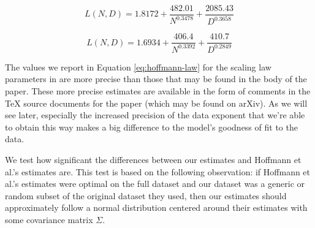 \documentclass[twocolumn]{article}
\begin{document}
\begin{tcolorbox}[colback=green!5!white,colframe=green!60!blue,title=Our estimated model]
\begin{equation}
L(N, D) = 1.8172 + \frac{482.01}{N^{0.3478}} + \frac{2085.43}{D^{0.3658}}
\end{equation}
\end{tcolorbox}

\begin{tcolorbox}[colback=green!5!white,colframe=green!60!blue,title=Hoffmann et al.'s estimated model]
\begin{equation}
\label{eq:hoffmann-law}
L(N, D) = 1.6934 + \frac{406.4}{N^{0.3392}} + \frac{410.7}{D^{0.2849}}
\end{equation}
\end{tcolorbox}

The values we report in Equation \ref{eq:hoffmann-law} for the scaling law parameters in \cite{hoffmann2022training} are more precise than those that may be found in the body of the paper. These more precise estimates are available in the form of comments in the TeX source documents for the paper (which may be found on arXiv). As we will see later, especially the increased precision of the data exponent that we're able to obtain this way makes a big difference to the model's goodness of fit to the data.

We test how significant the differences between our estimates and Hoffmann et al.'s estimates are. This test is based on the following observation: if Hoffmann et al.'s estimates were optimal on the full dataset and our dataset was a generic or random subset of the original dataset they used, then our estimates should approximately follow a normal distribution centered around their estimates with some covariance matrix \( \Sigma \).
\end{document}
